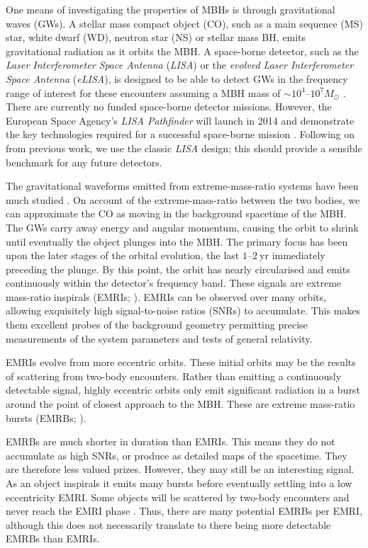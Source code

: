 \documentclass[useAMS,usedcolumn,usegraphicx,usenatbib]{mn2e}
\newcommand{\units}[1]{\ensuremath{~\mathrm{#1}}}
\begin{document}
One means of investigating the properties of MBHs is through gravitational waves (GWs). A stellar mass compact object (CO), such as a main sequence (MS) star, white dwarf (WD), neutron star (NS) or stellar mass BH, emits gravitational radiation as it orbits the MBH. A space-borne detector, such as the \textit{Laser Interferometer Space Antenna} (\textit{LISA}) or the \textit{evolved Laser Interferometer Space Antenna} (\textit{eLISA}), is designed to be able to detect GWs in the frequency range of interest for these encounters assuming a MBH mass of $\sim 10^4$--$10^7M_\odot$ \citep{Bender1998, Danzmann2003, Jennrich2011, Amaro-Seoane2012a}. There are currently no funded space-borne detector missions. However, the European Space Agency's \textit{LISA Pathfinder} will launch in 2014 and demonstrate the key technologies required for a successful space-borne mission \citep{Anza2005, Antonucci2012}. Following on from previous work, we use the classic \textit{LISA} design; this should provide a sensible benchmark for any future detectors.

The gravitational waveforms emitted from extreme-mass-ratio systems have been much studied \citep{Glampedakis2005, Barack2009}. On account of the extreme-mass-ratio between the two bodies, we can approximate the CO as moving in the background spacetime of the MBH. The GWs carry away energy and angular momentum, causing the orbit to shrink until eventually the object plunges into the MBH. The primary focus has been upon the later stages of the orbital evolution, the last $1$--$2\units{yr}$ immediately preceding the plunge. By this point, the orbit has nearly circularised and emits continuously within the detector's frequency band. These signals are extreme mass-ratio inspirals (EMRIs; \citealt{Amaro-Seoane2007}). EMRIs can be observed over many orbits, allowing exquisitely high signal-to-noise ratios (SNRs) to accumulate. This makes them excellent probes of the background geometry permitting precise measurements of the system parameters and tests of general relativity.

EMRIs evolve from more eccentric orbits. These initial orbits may be the results of scattering from two-body encounters. Rather than emitting a continuously detectable signal, highly eccentric orbits only emit significant radiation in a burst around the point of closest approach to the MBH. These are extreme mass-ratio bursts (EMRBs; \citealt*{Rubbo2006}).

EMRBs are much shorter in duration than EMRIs. This means they do not accumulate as high SNRs, or produce as detailed maps of the spacetime. They are therefore less valued prizes. However, they may still be an interesting signal. As an object inspirals it emits many bursts before eventually settling into a low eccentricity EMRI. Some objects will be scattered by two-body encounters and never reach the EMRI phase \citep{Alexander2003}. Thus, there are many potential EMRBs per EMRI, although this does not necessarily translate to there being more detectable EMRBs than EMRIs.
\end{document}
